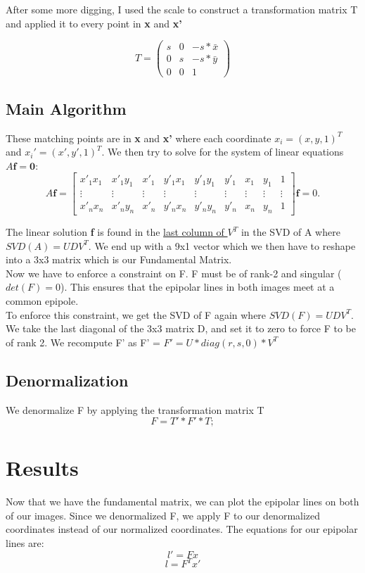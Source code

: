 \documentclass{article}
\begin{document}
After some more digging, I used the scale to construct a transformation matrix T and applied it to every point in \textbf{x} and \textbf{x'}

$$
T = \begin{pmatrix}
    s & 0 & -s * \bar{x}\\
    0 & s & -s * \bar{y}\\
    0 & 0 & 1 
\end{pmatrix}
$$

\subsection{Main Algorithm}
These matching points are in \textbf{x} and \textbf{x'} where each coordinate $x_i = (x,y,1)^T$ and $x_i' = (x',y',1)^T$. We then try to solve for the system of linear equations $A\textbf{f} = \textbf{0}$:
$$
A\mathbf{f} =
\begin{bmatrix}
x'_1 x_1 & x'_1 y_1 & x'_1 & y'_1 x_1 & y'_1 y_1 & y'_1 & x_1 & y_1 & 1 \\
\vdots & \vdots & \vdots & \vdots & \vdots & \vdots & \vdots & \vdots & \vdots \\
x'_n x_n & x'_n y_n & x'_n & y'_n x_n & y'_n y_n & y'_n & x_n & y_n & 1
\end{bmatrix}
\mathbf{f} = 0.
$$ 

The linear solution \textbf{f} is found in the \underline{last column of $V^T$} in the SVD of A where $SVD(A) = UDV^T$. We end up with a 9x1 vector which we then have to reshape into a 3x3 matrix which is our Fundamental Matrix.\\

Now we have to enforce a constraint on F. F must be of rank-2 and singular ($det(F) = 0$). This ensures that the epipolar lines in both images meet at a common epipole.\\

To enforce this constraint, we get the SVD of F again where $SVD(F) = UDV^T$. We take the last diagonal of the 3x3 matrix D, and set it to zero to force F to be of rank 2. We recompute F' as F' = $F' = U * diag(r, s, 0) * V^T$ \\

\subsection{Denormalization}
We denormalize F by applying the transformation matrix T
$$F = T' * F' * T; $$

\section{Results}
Now that we have the fundamental matrix, we can plot the epipolar lines on both of our images. Since we denormalized F, we apply F to our denormalized coordinates instead of our normalized coordinates. The equations for our epipolar lines are:
$$l' = F x$$
$$l= F^Tx'$$
\end{document}

